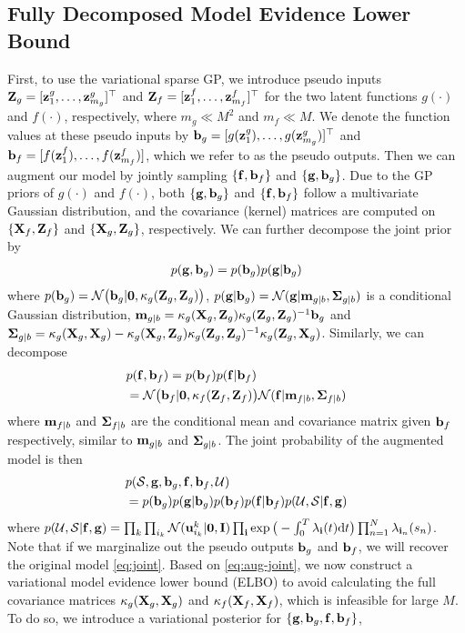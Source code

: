 \subsection{Fully Decomposed Model Evidence Lower Bound}
\vspace{-0.05in}
First, to use the variational sparse GP, we introduce pseudo inputs ${\bf Z}_g = [{\bf z}^g_{1}, \ldots, {\bf z}^g_{m_g}]^\top$ and ${\bf Z}_f = [{\bf z}^f_{1}, \ldots, {\bf z}^f_{m_f}]^\top$ for the two latent functions $g(\cdot)$ and $f(\cdot)$, respectively, where $m_g \ll M^2$ and $m_f \ll M$. We denote the function values at these pseudo inputs by ${\bf b}_g = [g({\bf z}^g_1), \ldots, g({\bf z}^g_{m_g})]^\top$ and ${\bf b}_f = [f({\bf z}^f_1), \ldots, f({\bf z}^f_{m_f})]$, which we refer to as the pseudo outputs. 
Then we can augment our model by jointly sampling $\{{\bf f}, {\bf b}_f\}$ and $\{{\bf g}, {\bf b}_g\}$. Due to the GP priors of $g(\cdot)$ and $f(\cdot)$, both $\{{\bf g}, {\bf b}_g\}$ and $\{{\bf f}, {\bf b}_f\}$ follow a multivariate Gaussian distribution, and the covariance (kernel) matrices are computed on $\{{\bf X}_f,{\bf Z}_f\}$ and $\{{\bf X}_g, {\bf Z}_g\}$, respectively. We can further decompose the joint prior by
\begin{align}
p({\bf g}, {\bf b}_g) = p({\bf b}_g) p({\bf g}|{\bf b}_g) \label{eq:prior-aug-g}
\end{align}
where $p({\bf b}_g) = \mathcal{N}\big({\bf b}_g|{\bf 0}, \kappa_g({\bf Z}_g, {\bf Z}_g)\big)$, $p({\bf g}|{\bf b}_g) = \mathcal{N}({\bf g}|{\bf m}_{g|b}, \boldsymbol{\Sigma}_{g|b})$ is a conditional Gaussian distribution,   ${\bf m}_{g|b} = \kappa_g({\bf X}_g, {\bf Z}_g)\kappa_g({\bf Z}_g, {\bf Z}_g)^{-1}{\bf b}_g$ and $\boldsymbol{\Sigma}_ {g|b} = \kappa_g({\bf X}_g, {\bf X}_g) - \kappa_g({\bf X}_g, {\bf Z}_g)\kappa_g({\bf Z}_g, {\bf Z}_g)^{-1}\kappa_g({\bf Z}_g, {\bf X}_g)$. Similarly, we can decompose %
\begin{align}
&p({\bf f}, {\bf b}_f) = p({\bf b}_f) p({\bf f}|{\bf b}_f) \label{eq:prior-aug-f} \\
&=  \mathcal{N}\big({\bf b}_f|{\bf 0}, \kappa_f({\bf Z}_f, {\bf Z}_f)\big)\mathcal{N}({\bf f}|{\bf m}_{f|b}, \boldsymbol{\Sigma}_{f|b}) \notag
\end{align}
where ${\bf m}_{f|b}$ and $\boldsymbol{\Sigma}_{f|b}$ are the conditional mean and covariance matrix given ${\bf b}_f$ respectively, similar to ${\bf m}_{g|b}$ and $\boldsymbol{\Sigma}_{g|b}$. The joint probability of the augmented model is then
\begin{align}
&p(\mathcal{S}, {\bf g}, {\bf b}_g, {\bf f}, {\bf b}_f, {\mathcal{U}}) \notag \\
&= p({\bf b}_g)p({\bf g}|{\bf b}_g) p({\bf b}_f)p({\bf f}|{\bf b}_f)  p({\mathcal{U}}, \mathcal{S}|{\bf f}, {\bf g}) \label{eq:aug-joint}
\end{align}
where $p({\mathcal{U}}, \mathcal{S}|{\bf f}, {\bf g}) = \prod_k\prod_{i_k} \mathcal{N}({\bf u}_{i_k}^k|{\bf 0}, {\bf I})\prod_{{\bf i}} \exp\big(-\int_0^T \lambda_{{\bf i}}(t){\rm d} t\big) \prod_{n=1}^N \lambda_{{\bf i}_n}(s_n)$. Note that if we marginalize out the pseudo outputs ${\bf b}_g$ and ${\bf b}_f$, we will recover the original model \eqref{eq:joint}. Based on \eqref{eq:aug-joint}, we now construct a variational model evidence lower bound (ELBO) to avoid calculating the full covariance matrices $\kappa_g({\bf X}_g, {\bf X}_g)$ and $\kappa_f({\bf X}_f, {\bf X}_f)$, which is infeasible for large $M$. To do so, we introduce a variational posterior for $\{{\bf g}, {\bf b}_g, {\bf f}, {\bf b}_f\}$, 
